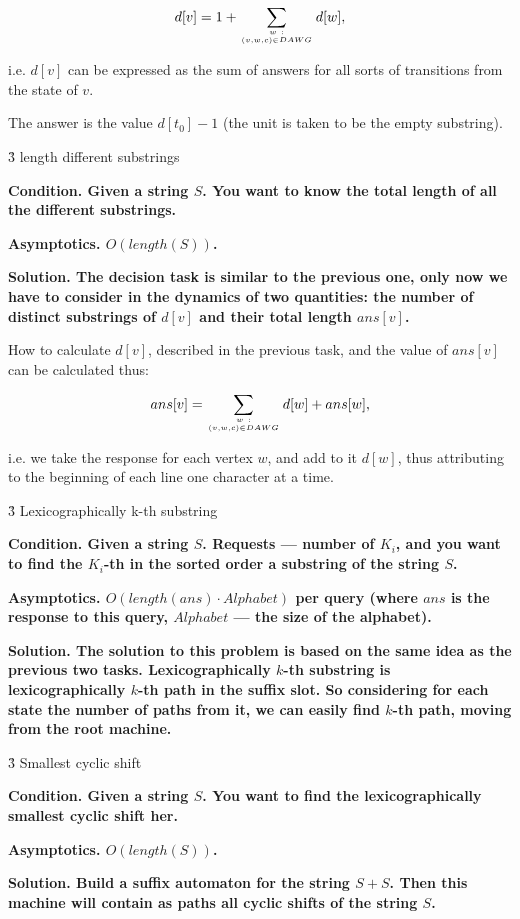 $$ d[v] = 1 + \sum_{w ~ : \atop (v,w,c) \in DAWG} d[w], $$

i.e. $d[v]$ can be expressed as the sum of answers for all sorts of transitions from the state of $v$.

The answer is the value $d[t_0]-1$ (the unit is taken to be the empty substring).


\h3{ length different substrings }

\bf{Condition}. Given a string $S$. You want to know the total length of all the different substrings.

\bf{Asymptotics}. $O (length (S))$.

\bf{Solution}. The decision task is similar to the previous one, only now we have to consider in the dynamics of two quantities: the number of distinct substrings of $d[v]$ and their total length $ans[v]$.

How to calculate $d[v]$, described in the previous task, and the value of $ans[v]$ can be calculated thus:

$$ ans[v] = \sum_{w ~ : \atop (v,w,c) \in DAWG} d[w] + ans[w], $$

i.e. we take the response for each vertex $w$, and add to it $d[w]$, thus attributing to the beginning of each line one character at a time.


\h3{ Lexicographically k-th substring }

\bf{Condition}. Given a string $S$. Requests --- number of $K_i$, and you want to find the $K_i$-th in the sorted order a substring of the string $S$.

\bf{Asymptotics}. $O (length (ans) \cdot Alphabet)$ per query (where $ans$ is the response to this query, $Alphabet$ --- the size of the alphabet).

\bf{Solution}. The solution to this problem is based on the same idea as the previous two tasks. Lexicographically $k$-th substring is lexicographically $k$-th path in the suffix slot. So considering for each state the number of paths from it, we can easily find $k$-th path, moving from the root machine.


\h3{ Smallest cyclic shift }

\bf{Condition}. Given a string $S$. You want to find the lexicographically smallest cyclic shift her.

\bf{Asymptotics}. $O (length (S))$.

\bf{Solution}. Build a suffix automaton for the string $S+S$. Then this machine will contain as paths all cyclic shifts of the string $S$.

